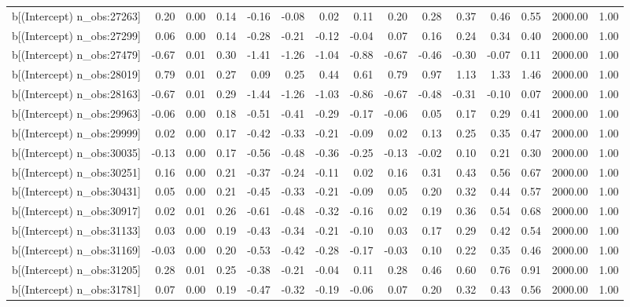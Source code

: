 \begin{table}[ht]
\begin{tabular}{rrrrrrrrrrrrrrr}
  b[(Intercept) n\_obs:27263] & 0.20 & 0.00 & 0.14 & -0.16 & -0.08 & 0.02 & 0.11 & 0.20 & 0.28 & 0.37 & 0.46 & 0.55 & 2000.00 & 1.00 \\ 
  b[(Intercept) n\_obs:27299] & 0.06 & 0.00 & 0.14 & -0.28 & -0.21 & -0.12 & -0.04 & 0.07 & 0.16 & 0.24 & 0.34 & 0.40 & 2000.00 & 1.00 \\ 
  b[(Intercept) n\_obs:27479] & -0.67 & 0.01 & 0.30 & -1.41 & -1.26 & -1.04 & -0.88 & -0.67 & -0.46 & -0.30 & -0.07 & 0.11 & 2000.00 & 1.00 \\ 
  b[(Intercept) n\_obs:28019] & 0.79 & 0.01 & 0.27 & 0.09 & 0.25 & 0.44 & 0.61 & 0.79 & 0.97 & 1.13 & 1.33 & 1.46 & 2000.00 & 1.00 \\ 
  b[(Intercept) n\_obs:28163] & -0.67 & 0.01 & 0.29 & -1.44 & -1.26 & -1.03 & -0.86 & -0.67 & -0.48 & -0.31 & -0.10 & 0.07 & 2000.00 & 1.00 \\ 
  b[(Intercept) n\_obs:29963] & -0.06 & 0.00 & 0.18 & -0.51 & -0.41 & -0.29 & -0.17 & -0.06 & 0.05 & 0.17 & 0.29 & 0.41 & 2000.00 & 1.00 \\ 
  b[(Intercept) n\_obs:29999] & 0.02 & 0.00 & 0.17 & -0.42 & -0.33 & -0.21 & -0.09 & 0.02 & 0.13 & 0.25 & 0.35 & 0.47 & 2000.00 & 1.00 \\ 
  b[(Intercept) n\_obs:30035] & -0.13 & 0.00 & 0.17 & -0.56 & -0.48 & -0.36 & -0.25 & -0.13 & -0.02 & 0.10 & 0.21 & 0.30 & 2000.00 & 1.00 \\ 
  b[(Intercept) n\_obs:30251] & 0.16 & 0.00 & 0.21 & -0.37 & -0.24 & -0.11 & 0.02 & 0.16 & 0.31 & 0.43 & 0.56 & 0.67 & 2000.00 & 1.00 \\ 
  b[(Intercept) n\_obs:30431] & 0.05 & 0.00 & 0.21 & -0.45 & -0.33 & -0.21 & -0.09 & 0.05 & 0.20 & 0.32 & 0.44 & 0.57 & 2000.00 & 1.00 \\ 
  b[(Intercept) n\_obs:30917] & 0.02 & 0.01 & 0.26 & -0.61 & -0.48 & -0.32 & -0.16 & 0.02 & 0.19 & 0.36 & 0.54 & 0.68 & 2000.00 & 1.00 \\ 
  b[(Intercept) n\_obs:31133] & 0.03 & 0.00 & 0.19 & -0.43 & -0.34 & -0.21 & -0.10 & 0.03 & 0.17 & 0.29 & 0.42 & 0.54 & 2000.00 & 1.00 \\ 
  b[(Intercept) n\_obs:31169] & -0.03 & 0.00 & 0.20 & -0.53 & -0.42 & -0.28 & -0.17 & -0.03 & 0.10 & 0.22 & 0.35 & 0.46 & 2000.00 & 1.00 \\ 
  b[(Intercept) n\_obs:31205] & 0.28 & 0.01 & 0.25 & -0.38 & -0.21 & -0.04 & 0.11 & 0.28 & 0.46 & 0.60 & 0.76 & 0.91 & 2000.00 & 1.00 \\ 
  b[(Intercept) n\_obs:31781] & 0.07 & 0.00 & 0.19 & -0.47 & -0.32 & -0.19 & -0.06 & 0.07 & 0.20 & 0.32 & 0.43 & 0.56 & 2000.00 & 1.00 \\ 

\end{tabular}
\end{table}
